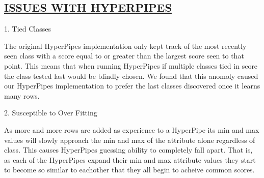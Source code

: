 \begin{kasten}
 \section*{ \hspace{0.1cm} {\color{red} \underline{ISSUES WITH HYPERPIPES}}}
  \large{

      1. Tied Classes
\vspace{3 mm}

The original HyperPipes implementation only kept track of the most recently seen class with a score 
equal to or greater than the largest score seen to that point. This means
that when running HyperPipes if multiple classes tied in score the class
tested last would be blindly chosen. We found that this anomoly caused our 
HyperPipes implementation to prefer the last classes discovered once it 
learns many rows.

\vspace{3 mm}
2. Susceptible to Over Fitting

\vspace{3 mm}
As more and more rows are added as experience to a HyperPipe 
its min and max values will slowly approach the min and max of the attribute 
alone regardless of class. This causes HyperPipes guessing ability to 
completely fall apart. That is, as each of the HyperPipes expand their min and 
max attribute values they start to become so similar to eachother that they all 
begin to acheive common scores.

  }
\end{kasten}
